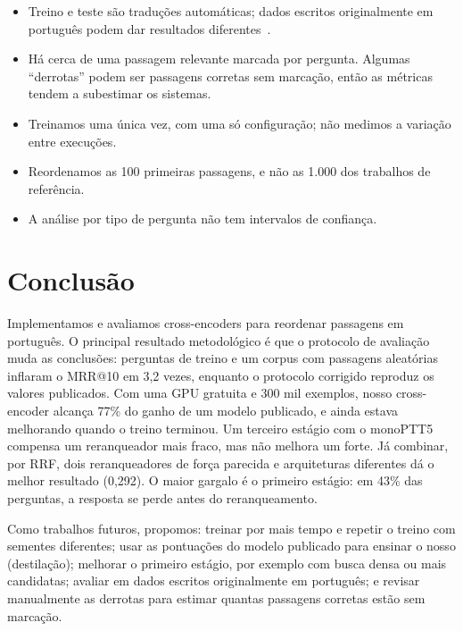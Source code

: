 \documentclass[12pt]{article}
\begin{document}
\begin{itemize}
  \item Treino e teste são traduções automáticas; dados escritos originalmente em português
  podem dar resultados diferentes~\cite{miyaji:2026}.
  \item Há cerca de uma passagem relevante marcada por pergunta. Algumas ``derrotas'' podem
  ser passagens corretas sem marcação, então as métricas tendem a subestimar os sistemas.
  \item Treinamos uma única vez, com uma só configuração; não medimos a variação entre
  execuções.
  \item Reordenamos as 100 primeiras passagens, e não as 1.000 dos trabalhos de referência.
  \item A análise por tipo de pergunta não tem intervalos de confiança.
\end{itemize}

\section{Conclusão}
\label{sec:conclusao}

Implementamos e avaliamos cross-encoders para reordenar passagens em português. O principal
resultado metodológico é que o protocolo de avaliação muda as conclusões: perguntas de treino
e um corpus com passagens aleatórias inflaram o MRR@10 em 3,2 vezes, enquanto o protocolo
corrigido reproduz os valores publicados. Com uma GPU gratuita e 300 mil exemplos, nosso
cross-encoder alcança 77\% do ganho de um modelo publicado, e ainda estava melhorando quando o
treino terminou. Um terceiro estágio com o monoPTT5 compensa um reranqueador mais fraco, mas não
melhora um forte. Já combinar, por RRF, dois reranqueadores de força parecida e arquiteturas
diferentes dá o melhor resultado (0,292). O maior gargalo é o primeiro estágio: em 43\% das
perguntas, a resposta se perde antes do reranqueamento.

Como trabalhos futuros, propomos: treinar por mais tempo e repetir o treino com sementes
diferentes; usar as pontuações do modelo publicado para ensinar o nosso (destilação); melhorar
o primeiro estágio, por exemplo com busca densa ou mais candidatas; avaliar em dados escritos
originalmente em português; e revisar manualmente as derrotas para estimar quantas passagens
corretas estão sem marcação.

\end{document}
